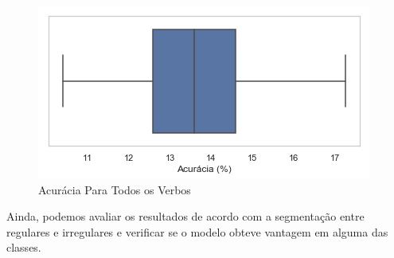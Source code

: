 \begin{figure}[H]
  \centering
  \includegraphics[width=0.6\linewidth]{img/mean_accuracy.png}
  \caption{Acurácia Para Todos os Verbos}
  \label{fig:acc}
\end{figure}

Ainda, podemos avaliar os resultados de acordo com a segmentação entre regulares e irregulares e verificar se o modelo obteve vantagem em alguma das classes. 

